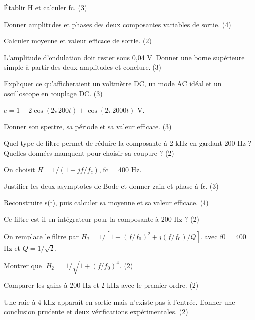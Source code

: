 \begin{questions}
\item Établir H et calculer fc. (3)
\item Donner amplitudes et phases des deux composantes variables de sortie. (4)
\item Calculer moyenne et valeur efficace de sortie. (2)
\end{questions}

\begin{questions}
\item L’amplitude d’ondulation doit rester sous 0,04 V. Donner une borne supérieure simple à partir des deux amplitudes et conclure. (3)
\item Expliquer ce qu’afficheraient un voltmètre DC, un mode AC idéal et un oscilloscope en couplage DC. (3)
\end{questions}



$e=1+2\cos(2\pi200t)+\cos(2\pi2000t)$ V.\begin{questions}
\item Donner son spectre, sa période et sa valeur efficace. (3)
\item Quel type de filtre permet de réduire la composante à 2 kHz en gardant 200 Hz ? Quelles données manquent pour choisir sa coupure ? (2)
\end{questions}

On choisit $H=1/(1+jf/f_c)$, fc = 400 Hz.\begin{questions}
\item Justifier les deux asymptotes de Bode et donner gain et phase à fc. (3)
\item Reconstruire s(t), puis calculer sa moyenne et sa valeur efficace. (4)
\item Ce filtre est-il un intégrateur pour la composante à 200 Hz ? (2)
\end{questions}



On remplace le filtre par $H_2=1/[1-(f/f_0)^2+j(f/f_0)/Q]$, avec f0 = 400 Hz et $Q=1/\sqrt2$.\begin{questions}
\item Montrer que $|H_2|=1/\sqrt{1+(f/f_0)^4}$. (2)
\item Comparer les gains à 200 Hz et 2 kHz avec le premier ordre. (2)
\item Une raie à 4 kHz apparaît en sortie mais n’existe pas à l’entrée. Donner une conclusion prudente et deux vérifications expérimentales. (2)
\end{questions}

